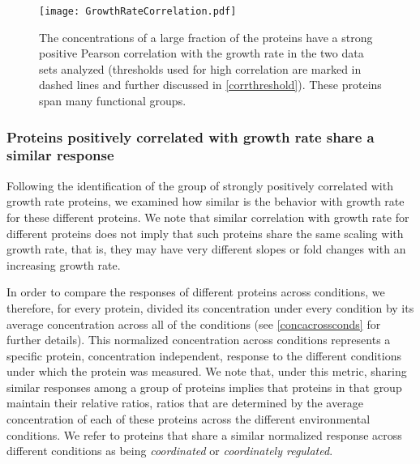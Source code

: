 \documentclass[notitlepage]{article}
\begin{document}
\begin{figure}[h]
\centering
\texttt{[image: GrowthRateCorrelation.pdf]}
\caption{
The concentrations of a large fraction of the proteins have a strong positive Pearson correlation with the growth rate in the two data sets analyzed (thresholds used for high correlation are marked in dashed lines and further discussed in \ref{corrthreshold}).
These proteins span many functional groups.
}
\label{fig:growthcorr}
\end{figure}
\subsubsection{Proteins positively correlated with growth rate share a similar response}
\label{propchange}
Following the identification of the group of strongly positively correlated with growth rate proteins, we examined how similar is the behavior with growth rate for these different proteins.
We note that similar correlation with growth rate for different proteins does not imply that such proteins share the same scaling with growth rate, that is,  they may have very different slopes or fold changes with an increasing growth rate.

In order to compare the responses of different proteins across conditions, we therefore, for every protein, divided its concentration under every condition by its average concentration across all of the conditions (see \ref{concacrossconds} for further details).
This normalized concentration across conditions represents a specific protein, concentration independent, response to the different conditions under which the protein was measured.
We note that, under this metric, sharing similar responses among a group of proteins implies that proteins in that group maintain their relative ratios, ratios that are determined by the average concentration of each of these proteins across the different environmental conditions.
We refer to proteins that share a similar normalized response across different conditions as being \emph{coordinated} or \emph{coordinately regulated}.
\end{document}
